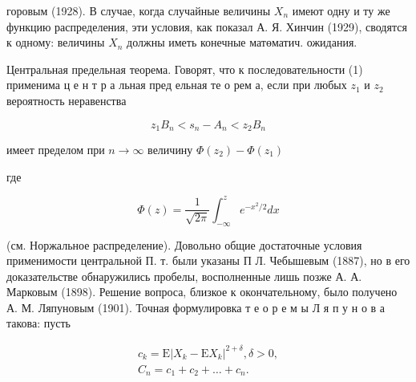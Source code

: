 \documentclass[10pt]{article}
\begin{document}
горовым (1928). В случае, когда случайные величины $X_{n}$ имеют одну и ту же функцию распределения, эти условия, как показал А. Я. Хинчин (1929), сводятся к одному: величины $X_{n}$ должны иметь конечные матөматич. ожидания.



Центральная предельная теорема. Говорят, что к последовательности (1) применима ц е н т р а льная пред ельная те о рем а, если при любых $z_{1}$ и $z_{2}$ вероятность неравенства



\[

z_{1} B_{n}<s_{n}-A_{n}<z_{2} B_{n}

\]



имеет пределом при $n \rightarrow \infty$ величину $\Phi\left(z_{2}\right)-\Phi\left(z_{1}\right)$



где



\[

\Phi(z)=\frac{1}{\sqrt{2 \pi}} \int_{-\infty}^{z} e^{-x^{2} / 2} d x

\]



(см. Норжальное распределение). Довольно общие достаточные условия применимости центральной П. т. были указаны П Л. Чебышевым (1887), но в его доказательстве обнаружились пробелы, восполненные лишь позже А. А. Марковым (1898). Решение вопроса, близкое к окончательному, было получено А. М. Ляпуновым (1901). Точная формулировка т е о р е м ы Л я п у н о в а такова: пусть



\[

\begin{gathered}

c_{k}=\mathrm{E}\left|X_{k}-\mathrm{E} X_{k}\right|^{2+\delta}, \delta>0, \\

C_{n}=c_{1}+c_{2}+\ldots+c_{n} .

\end{gathered}

\]
\end{document}
